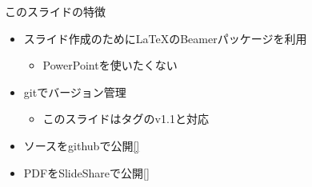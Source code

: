 \begin{frame}{このスライドの特徴}
 \begin{itemize}
  \item スライド作成のために\LaTeX のBeamerパッケージを利用
        \begin{itemize}
         \item PowerPointを使いたくない
        \end{itemize}
  \item gitでバージョン管理
        \begin{itemize}
         \item このスライドはタグのv1.1と対応
        \end{itemize}
  \item ソースをgithubで公開\href{https://github.com/sakabar/prml_titech_2-3-1_2-3-7}{[]}
  \item PDFをSlideShareで公開\href{http://www.slideshare.net/takafumisakakibara75/slide-41820194}{[]}
 \end{itemize}
\end{frame}
